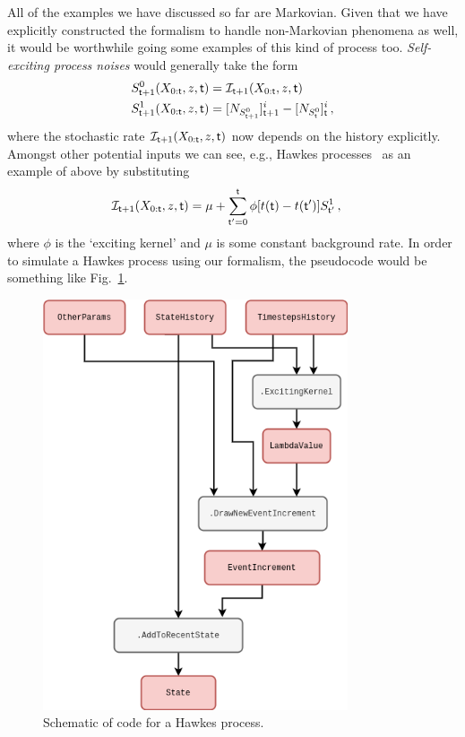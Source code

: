 All of the examples we have discussed so far are Markovian. Given that we have explicitly constructed the formalism to handle non-Markovian phenomena as well, it would be worthwhile going some examples of this kind of process too. \emph{Self-exciting process noises} would generally take the form
\begin{align}
S^{0}_{{\sf t}+1}(X_{0:{\sf t}},z,{\sf t}) &= {\cal I}_{{\sf t}+1} (X_{0:{\sf t}},z,{\sf t}) \\
S^{1}_{{\sf t}+1}(X_{0:{\sf t}},z,{\sf t}) &= [N_{S^{0}_{{\sf t}+1}}]^i_{{\sf t}+1}-[N_{S^{0}_{{\sf t}}}]^i_{\sf t} \,,
\end{align}
where the stochastic rate ${\cal I}_{{\sf t}+1} (X_{0:{\sf t}},z,{\sf t})$ now depends on the history explicitly. Amongst other potential inputs we can see, e.g., Hawkes processes~\cite{hawkes1971spectra} as an example of above by substituting 
\begin{align}
{\cal I}_{{\sf t}+1} (X_{0:{\sf t}},z,{\sf t}) &= \mu + \sum^{{\sf t}}_{{\sf t}'=0}\phi [t({\sf t})-t({\sf t}')]S^{1}_{{\sf t}'} \,,
\end{align}
where $\phi$ is the `exciting kernel' and $\mu$ is some constant background rate. In order to simulate a Hawkes process using our formalism, the pseudocode would be something like Fig.~\ref{fig:hawkes-process}.

\begin{figure}[h]
\centering
\includegraphics[width=9cm]{images/chapter-1-hawkes-process.drawio.png}
\caption{Schematic of code for a Hawkes process.}
\label{fig:hawkes-process}
\end{figure}


